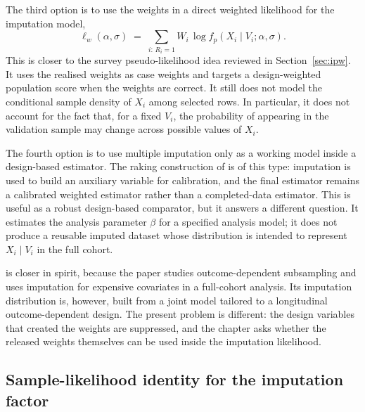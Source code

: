 The third option is to use the weights in a direct weighted likelihood for the imputation model,
\begin{equation}
\ell_w(\alpha,\sigma)
\;=\;
\sum_{i:\,R_i = 1} W_i\,\log f_p(X_i\mid V_i;\alpha,\sigma).
\label{eq:SISL_weighted_MI}
\end{equation}
This is closer to the survey pseudo-likelihood idea reviewed in Section~\ref{sec:ipw}. It uses the realised weights as case weights and targets a design-weighted population score when the weights are correct. It still does not model the conditional sample density of $X_i$ among selected rows. In particular, it does not account for the fact that, for a fixed $V_i$, the probability of appearing in the validation sample may change across possible values of $X_i$.

The fourth option is to use multiple imputation only as a working model inside a design-based estimator. The raking construction of \citet{han2021combining} is of this type: imputation is used to build an auxiliary variable for calibration, and the final estimator remains a calibrated weighted estimator rather than a completed-data estimator. This is useful as a robust design-based comparator, but it answers a different question. It estimates the analysis parameter $\beta$ for a specified analysis model; it does not produce a reusable imputed dataset whose distribution is intended to represent $X_i\mid V_i$ in the full cohort.

\citet{schildcrout2015biased} is closer in spirit, because the paper studies outcome-dependent subsampling and uses imputation for expensive covariates in a full-cohort analysis. Its imputation distribution is, however, built from a joint model tailored to a longitudinal outcome-dependent design. The present problem is different: the design variables that created the weights are suppressed, and the chapter asks whether the released weights themselves can be used inside the imputation likelihood.

\subsection{Sample-likelihood identity for the imputation factor}
\label{sec:SISL_background_samplelik}

